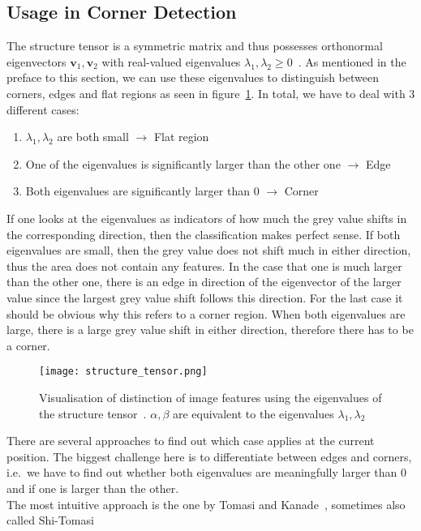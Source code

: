 \subsection{Usage in Corner Detection}\label{sub:Corner}
The structure tensor is a symmetric matrix and thus possesses orthonormal eigenvectors $\boldsymbol v_1,
\boldsymbol v_2$ with real-valued eigenvalues $\lambda_1, \lambda_2 \geq 0$~\cite{ipcv}. As
mentioned in the preface to this section, we can use these eigenvalues to distinguish between
corners, edges and flat regions as seen in figure~\ref{fig:Structure}.
In total, we have to deal with 3 different cases:
\begin{enumerate}
    \item $\lambda_1, \lambda_2$ are both small $\rightarrow$ Flat region
    \item One of the eigenvalues is significantly larger than the other one $\rightarrow$ Edge
    \item Both eigenvalues are significantly larger than 0 $\rightarrow$ Corner
\end{enumerate}
If one looks at the eigenvalues as indicators of how much the grey value shifts in the
corresponding
direction, then the classification makes perfect sense. If both eigenvalues are small, then the
grey value does not shift much in either direction, thus the area does not contain any features.
In the case that one is much larger than the other one, there is an edge in direction of the
eigenvector of the larger value since the largest grey value shift follows this direction.
For the last case it should be obvious why this refers to a corner region. When both eigenvalues
are large, there is a large grey value shift in either direction, therefore there has to be a
corner.
\begin{figure}[H]
    \centering
    \texttt{[image: structure\_tensor.png]}
    \caption{Visualisation of distinction of image features using the eigenvalues of the structure
        tensor~\cite{harris88}. $\alpha, \beta$ are equivalent to the eigenvalues $\lambda_1, \lambda_2$}\label{fig:Structure}
\end{figure}
\noindent There are several approaches to find out which case applies at the current position. The biggest
challenge here is to differentiate between edges and corners, i.e.\ we have to find out whether both
eigenvalues are meaningfully larger than 0 and if one is larger than the other.\\
The most intuitive approach is the one by Tomasi and Kanade~\cite{tomasi91}, sometimes also called Shi-Tomasi

